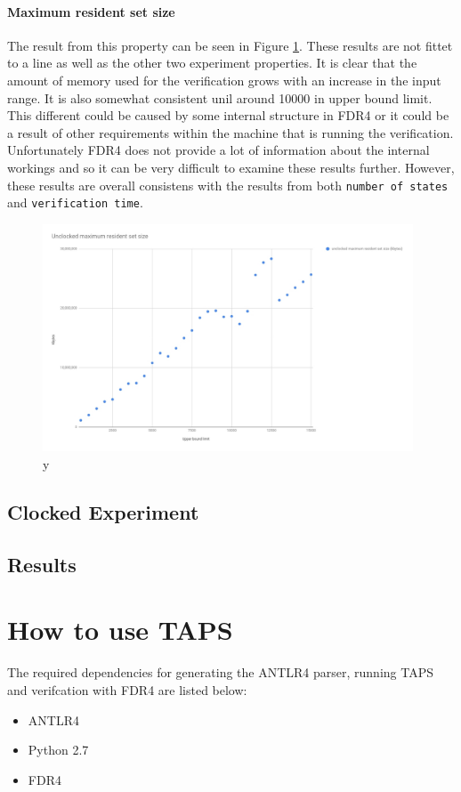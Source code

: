 \paragraph{Maximum resident set size}
The result from this property can be seen in Figure \ref{fig:unclocked_resident_size}. These results are not fittet to a line as well as the other two experiment properties. It is clear that the amount of memory used for the verification grows with an increase in the input range. It is also somewhat consistent unil around 10000 in upper bound limit. This different could be caused by some internal structure in FDR4 or it could be a result of other requirements within the machine that is running the verification. Unfortunately FDR4 does not provide a lot of information about the internal workings and so it can be very difficult to examine these results further. However, these results are overall consistens with the results from both \texttt{number of states} and \texttt{verification time}.
\begin{figure}
    \includegraphics[width=0.98\textwidth]{./figures/15-11-2018/unclocked_maximum_resident_set_size.jpg}
\caption{y}
\label{fig:unclocked_resident_size}
\end{figure}


\subsection{Clocked Experiment}
\subsection{Results}


\newpage
\section{How to use TAPS}
The required dependencies for generating the ANTLR4 parser, running TAPS and verifcation with FDR4 are listed below:
\begin{itemize}
    \item ANTLR4
    \item Python 2.7
    \item FDR4
\end{itemize}

